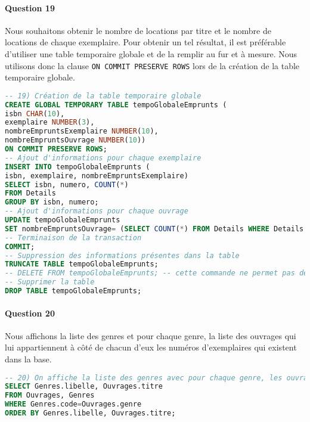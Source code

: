 \documentclass[10pt, oneside]{article}
\begin{document}

\paragraph{Question 19} Nous souhaitons obtenir le nombre de locations par titre et le nombre de locations de chaque exemplaire. Pour obtenir un tel résultat, il est préférable d'utiliser une table temporaire globale et de la remplir au fur et à mesure. Nous utilisons donc la clause \texttt{ON COMMIT PRESERVE ROWS} lors de la création de la table temporaire globale.

\begin{lstlisting}[language=sql, title=Question 19, label=QII19]
-- 19) Création de la table temporaire globale
CREATE GLOBAL TEMPORARY TABLE tempoGlobaleEmprunts (
isbn CHAR(10),
exemplaire NUMBER(3),
nombreEmpruntsExemplaire NUMBER(10),
nombreEmpruntsOuvrage NUMBER(10)) 
ON COMMIT PRESERVE ROWS;
-- Ajout d'informations pour chaque exemplaire
INSERT INTO tempoGlobaleEmprunts (
isbn, exemplaire, nombreEmpruntsExemplaire)
SELECT isbn, numero, COUNT(*)
FROM Details
GROUP BY isbn, numero;
-- Ajout d'informations pour chaque ouvrage
UPDATE tempoGlobaleEmprunts
SET nombreEmpruntsOuvrage= (SELECT COUNT(*) FROM Details WHERE Details.isbn=tempoGlobaleEmprunts.isbn);
-- Terminaison de la transaction 
COMMIT;
-- Suppression des informations présentes dans la table
TRUNCATE TABLE tempoGlobaleEmprunts;
-- DELETE FROM tempoGlobaleEmprunts; -- cette commande ne permet pas de supprimer la table temporaire par la suite
-- Supprimer la table
DROP TABLE tempoGlobaleEmprunts;
\end{lstlisting}


\paragraph{Question 20} Nous affichons la liste des genres et pour chaque genre, la liste des ouvrages qui lui appartiennent à côté de chacun d'eux les numéros d'exemplaires qui existent dans la base.

\begin{lstlisting}[language=sql, title=Question 20, label=QII20]
-- 20) On affiche la liste des genres avec pour chaque genre, les ouvrages correspondant
SELECT Genres.libelle, Ouvrages.titre
FROM Ouvrages, Genres
WHERE Genres.code=Ouvrages.genre
ORDER BY Genres.libelle, Ouvrages.titre;
\end{lstlisting}
\end{document}

